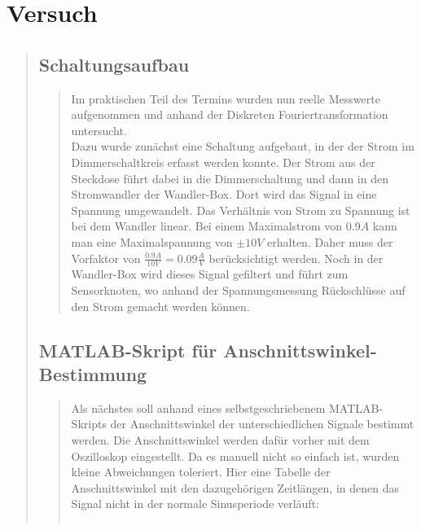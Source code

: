 \section{Versuch}
\begin{quote}

	\subsection{Schaltungsaufbau}
	\begin{quote}
	Im praktischen Teil des Termins wurden nun reelle Messwerte aufgenommen und
	anhand der Diskreten Fouriertransformation untersucht.\\
	Dazu wurde zunächst eine Schaltung aufgebaut, in der der Strom im
	Dimmerschaltkreis erfasst werden konnte. Der Strom aus der Steckdose führt
	dabei in die Dimmerschaltung und dann in den Stromwandler der Wandler-Box. Dort
	wird das Signal in eine Spannung umgewandelt. Das Verhältnis von Strom zu
	Spannung ist bei dem Wandler linear. Bei einem Maximalstrom von $0.9 A$ kann
	man eine Maximalspannung von $\pm 10 V$ erhalten. Daher muss der Vorfaktor von
	$\frac{0.9 A}{10 V} = 0.09 \frac{A}{V}$ berücksichtigt werden. Noch in der
	Wandler-Box wird dieses Signal gefiltert und führt zum Sensorknoten, wo anhand
	der Spannungsmessung Rückschlüsse auf den Strom gemacht werden können.
	\end{quote}
	
	\subsection{MATLAB-Skript für Anschnittswinkel-Bestimmung}
	\begin{quote}	
	Als nächstes soll anhand eines selbstgeschriebenem MATLAB-Skripts der
	Anschnittswinkel der unterschiedlichen Signale bestimmt werden. Die
	Anschnittswinkel werden dafür vorher mit dem Oszilloskop eingestellt. Da es
	manuell nicht so einfach ist, wurden kleine Abweichungen toleriert. Hier eine
	Tabelle der Anschnittswinkel mit den dazugehörigen Zeitlängen, in denen das
	Signal nicht in der normale Sinusperiode verläuft:
	
	   \begin{center}
                 \begin{tabular}{|c|c|c|}
                             

\end{tabular}
\end{center}
\end{quote}
\end{quote}
